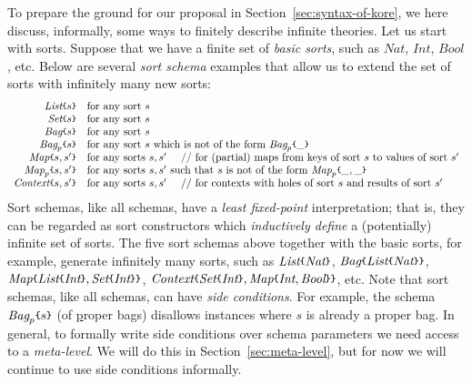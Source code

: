 \documentclass[UTF8,11pt]{article}
\theoremstyle{plain}
\theoremstyle{definition}
\theoremstyle{remark}
\newcommand{\Nat}{\textit{Nat}}
\newcommand{\Int}{\textit{Int}}
\newcommand{\Bool}{\textit{Bool}}
\newcommand{\List}{\textit{List}}
\newcommand{\Bag}{\textit{Bag}}
\newcommand{\Set}{\textit{Set}}
\newcommand{\Map}{\textit{Map}}
\newcommand{\Context}{\textit{Context}}
\newcommand{\parametric}[2]{{#1}\raisebox{.2ex}{\texttt{\footnotesize{\{}}}#2\raisebox{.2ex}{\texttt{\footnotesize{\}}}}}
\begin{document}
To prepare the ground for our proposal in Section~\ref{sec:syntax-of-kore},
we here discuss, informally, some ways to finitely describe infinite theories.
Let us start with sorts.
Suppose that we have a finite set of \emph{basic sorts}, such as
$\Nat$, $\Int$, $\Bool$, etc.
Below are several \emph{sort schema} examples that allow us to extend the set
of sorts with infinitely many new sorts:
$$
\begin{array}{rl}
\parametric{\List}{s} &
\textrm{for any sort $s$} \\
\parametric{\Set}{s} &
\textrm{for any sort $s$} \\
\parametric{\Bag}{s} &
\textrm{for any sort $s$} \\
\parametric{\Bag_p}{s} &
\textrm{for any sort $s$ which is not of the form $\parametric{\Bag_p}{\_}$} \\
\parametric{\Map}{s,s'} &
\textrm{for any sorts $s,s'$ \ \ \ // for (partial) maps from keys of sort $s$ to values of sort $s'$} \\
\parametric{\Map_p}{s,s'} &
\textrm{for any sorts $s,s'$ such that $s$ is not of the form $\parametric{\Map_p}{\_,\_}$}
\\
\parametric{\Context}{s,s'} &
\textrm{for any sorts $s,s'$ \ \ \ // for contexts with holes of sort $s$ and results of sort $s'$}
\end{array}
$$
Sort schemas, like all schemas, have a \emph{least fixed-point}
interpretation;
that is, they can be regarded as sort constructors which
{\em inductively define} a (potentially) infinite set of sorts.
The five sort schemas above together with the basic sorts, for example,
generate infinitely many sorts, such as
$\parametric{\List}{\Nat}$,
$\parametric{\Bag}{\parametric{\List}{\Nat}}$,
$\parametric{\Map}{\parametric{\List}{\Int},\parametric{\Set}{\Int}}$,
$\parametric{\Context}{\parametric{\Set}{\Int},\parametric{\Map}{\Int,\Bool}}$,
etc.
Note that sort schemas, like all schemas, can have \emph{side conditions}.
For example, the schema $\parametric{\Bag_p}{s}$ (of \underline{p}roper bags)
disallows instances where $s$ is already a proper bag.
In general, to formally write side conditions over schema parameters we need
access to a \emph{meta-level}.
We will do this in Section~\ref{sec:meta-level}, but for now we will continue
to use side conditions informally.
\end{document}
